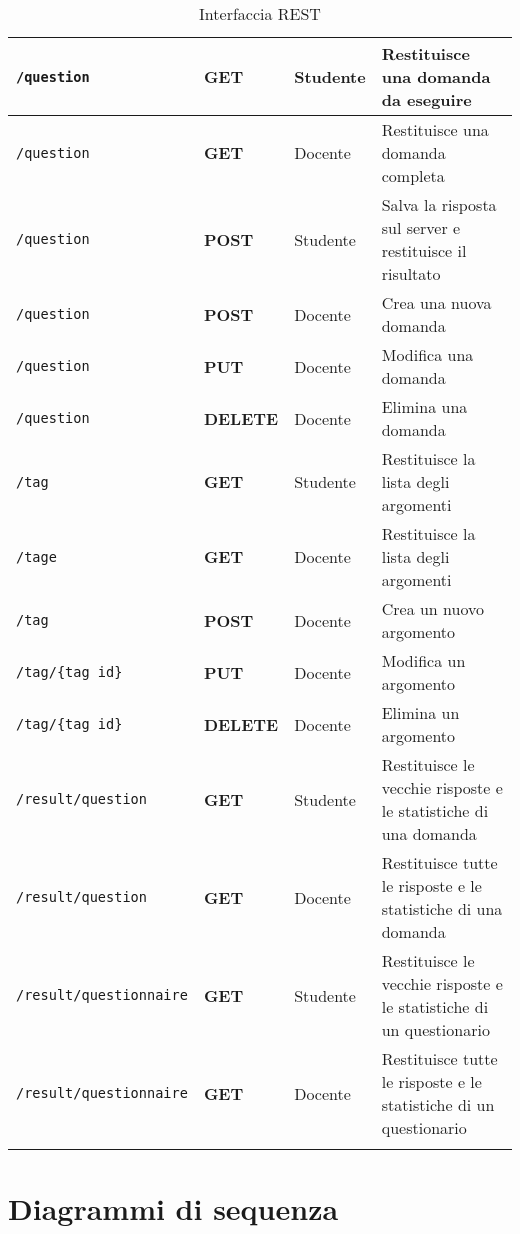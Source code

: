 \documentclass[12pt,a4paper]{article}
\begin{document}
\begin{center}
\begin{longtable}[H]{p{} p{} p{} p{}}
		\midrule
		\midrule
		\texttt{/question} & \textbf{GET} & Studente & Restituisce una domanda da eseguire \\*
		\midrule
		\texttt{/question} & \textbf{GET} & Docente & Restituisce una domanda completa \\*
		\midrule
		\texttt{/question} & \textbf{POST} & Studente & Salva la risposta sul server e restituisce il risultato \\*
		\midrule
		\texttt{/question} & \textbf{POST} & Docente & Crea una nuova domanda \\*
		\midrule
		\texttt{/question} & \textbf{PUT} & Docente & Modifica una domanda \\*
		\midrule
		\texttt{/question} & \textbf{DELETE} & Docente & Elimina una domanda \\*
		
		\midrule
		\midrule
		\texttt{/tag} & \textbf{GET} & Studente & Restituisce la lista degli argomenti \\*
		\midrule
		\texttt{/tage} & \textbf{GET} & Docente & Restituisce la lista degli argomenti \\*
		\midrule
		\texttt{/tag} & \textbf{POST} & Docente & Crea un nuovo argomento \\*
		\midrule
        \texttt{/tag/\{tag id\}} & \textbf{PUT} & Docente & Modifica un argomento \\*
		\midrule
		\texttt{/tag/\{tag id\}} & \textbf{DELETE} & Docente & Elimina un argomento \\*
		
		\midrule
		\midrule
		\texttt{/result/question} & \textbf{GET} & Studente & Restituisce le vecchie risposte e le statistiche di una domanda \\*
		\midrule
		\texttt{/result/question} & \textbf{GET} & Docente & Restituisce tutte le risposte e le statistiche di una domanda \\*
		\midrule
		\texttt{/result/questionnaire} & \textbf{GET} & Studente & Restituisce le vecchie risposte e le statistiche di un questionario \\*
		\midrule
		\texttt{/result/questionnaire} & \textbf{GET} & Docente & Restituisce tutte le risposte e le statistiche di un questionario \\*
		\bottomrule
		\caption{Interfaccia REST}
		\label{tab:intrest}
	\end{longtable}
\end{center}

\newpage
\section{Diagrammi di sequenza}
\end{document}
